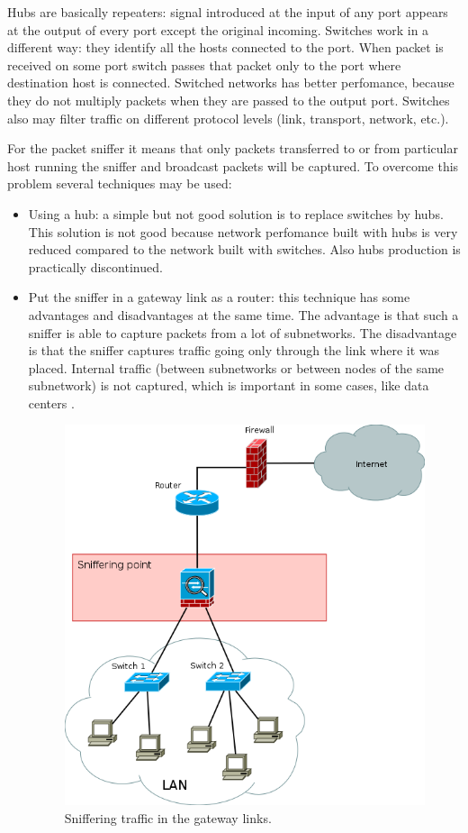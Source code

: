 \documentclass[thesis=M,english]{FITthesis}[2011/07/15]
\begin{document}
Hubs are basically repeaters: signal introduced at the input of any port appears at the output of every port except the original incoming. Switches work in a different way: they identify all the hosts connected to the port. When packet is received on some port switch passes that packet only to the port where destination host is connected. Switched networks has better perfomance, because they do not multiply packets when they are passed to the output port. Switches also may filter traffic on different protocol levels (link, transport, network, etc.).

For the packet sniffer it means that only packets transferred to or from particular host running the sniffer and broadcast packets will be captured. To overcome this problem several techniques may be used\cite{gpu_framework}:

\begin{itemize}
\item Using a hub: a simple but not good solution is to replace switches by hubs. This solution is not good because network perfomance built with hubs is very reduced compared to the network built with switches. Also hubs production is practically discontinued.
\item Put the sniffer in a gateway link as a router: this technique has some advantages and disadvantages at the same time. The advantage is that such a sniffer is able to capture packets from a lot of subnetworks. The disadvantage is that the sniffer captures traffic going only through the link where it was placed. Internal traffic (between subnetworks or between nodes of the same subnetwork) is not captured, which is important in some cases, like data centers \cite{act_defense_model}. 

\begin{figure}[h]
\centering
\includegraphics[scale=0.6]{images/gateway_sniffering.png}
\caption{Sniffering traffic in the gateway links.}
\label{fig:gateway_sniffering}
\end{figure}


\end{itemize}
\end{document}
